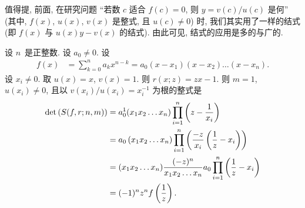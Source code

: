 \documentclass[../libro.tex]{subfiles}
\begin{document}
值得提, 前面, 在研究问题
``若数 \(c\) 适合 \(f(c) = 0\),
则 \(y = v(c) / u(c)\) 是何''
(其中, \(f(x)\), \(u(x)\), \(v(x)\) 是整式,
且 \(u(c) \neq 0\))
时,
我们其实用了一样的结式
(即 \(f(x)\) 与 \(u(x) y - v(x)\) 的结式).
由此可见, 结式的应用是多的与广的.

\begin{example}
    设 \(n\)~是正整数.
    设 \(a_0 \neq 0\).
    设
    \begin{align*}
        f(x) &
        = \sum_{k = 0}^{n} {a_k x^{n-k}}
        = a_0 (x - x_1) (x - x_2) \dots (x - x_n).
    \end{align*}
    设 \(x_i \neq 0\).
    取 \(u(x) = x\), \(v(x) = 1\).
    则 \(r(x; z) = z x - 1\).
    则 \(m = 1\), \(u(x_i) \neq 0\),
    且以 \(v(x_i) / u(x_i) = x_i^{-1}\)
    为根的整式是
    \begin{align*}
        \det {(S(f, r; n, m))}
        = {} &
        a_0^1
        (x_1 x_2 \dots x_n)
        \prod_{i = 1}^{n}
        {\left(z - \frac{1}{x_i}\right)}
        \\
        = {} &
        a_0\, (x_1 x_2 \dots x_n)
        \prod_{i = 1}^{n}
        {\left(
                \frac{-z}{x_i} \left(\frac{1}{z} - x_i\right)
        \right)}
        \\
        = {} &
        (x_1 x_2 \dots x_n)
        \frac{(-z)^n}{x_1 x_2 \dots x_n}
        a_0 \prod_{i = 1}^{n}
        {\left(\frac{1}{z} - x_i\right)}
        \\
        = {} &
        (-1)^n z^n f\left(\frac{1}{z}\right).
        \qedhere
    \end{align*}
\end{example}
\end{document}
